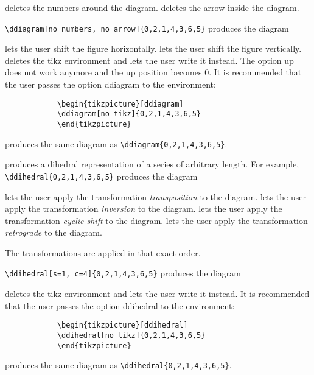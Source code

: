 \documentclass{article}
\begin{document}
\begin{itemize}
		
		\begin{itemize}
			 deletes the numbers around the diagram.
			 deletes the arrow inside the diagram.
		\end{itemize}
		
		\verb|\ddiagram[no numbers, no arrow]{0,2,1,4,3,6,5}| produces the diagram\\
		\ddiagram[no numbers, no arrow]{0,2,1,4,3,6,5}
		
		\begin{itemize}
			 lets the user shift the figure horizontally.
			 lets the user shift the figure vertically.
			 deletes the tikz environment and lets the user write it instead.
			The option \textsf{up} does not work anymore and the up position becomes 0.
			It is recommended that the user passes the option \textsf{ddiagram} to the environment:			
			\begin{verbatim}
			\begin{tikzpicture}[ddiagram]
			\ddiagram[no tikz]{0,2,1,4,3,6,5}
			\end{tikzpicture}
			\end{verbatim} produces the same diagram as  \verb|\ddiagram{0,2,1,4,3,6,5}|.
		\end{itemize}
		
		 produces a dihedral representation of a series of arbitrary length. For example, \verb|\ddihedral{0,2,1,4,3,6,5}| produces the diagram\\
		\ddihedral{0,2,1,4,3,6,5}
		
		\begin{itemize}
			 lets the user apply the transformation \textit{transposition} to the diagram.
			 lets the user apply the transformation \textit{inversion} to the diagram.
			 lets the user apply the transformation \textit{cyclic shift} to the diagram.
			 lets the user apply the transformation \textit{retrograde} to the diagram.
			
			The transformations are applied in that exact order.
		\end{itemize}
		
		 \verb|\ddihedral[s=1, c=4]{0,2,1,4,3,6,5}| produces the diagram\\
		\ddihedral[s=1, c=4]{0,2,1,4,3,6,5}
		
		\begin{itemize}
			 deletes the tikz environment and lets the user write it instead. It is recommended that the user passes the option \textsf{ddihedral} to the environment:
			\begin{verbatim}
			\begin{tikzpicture}[ddihedral]
			\ddihedral[no tikz]{0,2,1,4,3,6,5}
			\end{tikzpicture}
			\end{verbatim} produces the same diagram as  \verb||.
		\end{itemize}
		

\end{itemize}
\end{document}
